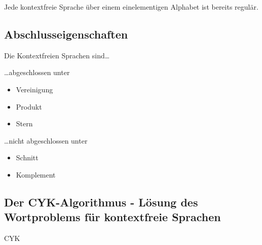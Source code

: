 \documentclass{scrartcl}
\begin{document}
Jede kontextfreie Sprache über einem einelementigen Alphabet ist bereits regulär.

\subsection*{Abschlusseigenschaften}
\begin{shaded}
Die Kontextfreien Sprachen sind\dots \\

\begin{minipage}[t]{0.48\textwidth}
\dots abgeschlossen unter
\begin{itemize}
    \item Vereinigung
    \item Produkt
    \item Stern
\end{itemize}
\end{minipage}
\hfill \vrule \hfill
\begin{minipage}[t]{0.48\textwidth}
\dots nicht abgeschlossen unter
\begin{itemize}
    \item Schnitt
    \item Komplement
\end{itemize}
\end{minipage}
\end{shaded}

\subsection*{Der CYK-Algorithmus - Lösung des Wortproblems für kontextfreie Sprachen}
\begin{algorithm}[H]
    \caption{CYK}
    \SetAlgoLined
    \LinesNumbered
    \PrintSemicolon
\end{algorithm}
\end{document}

